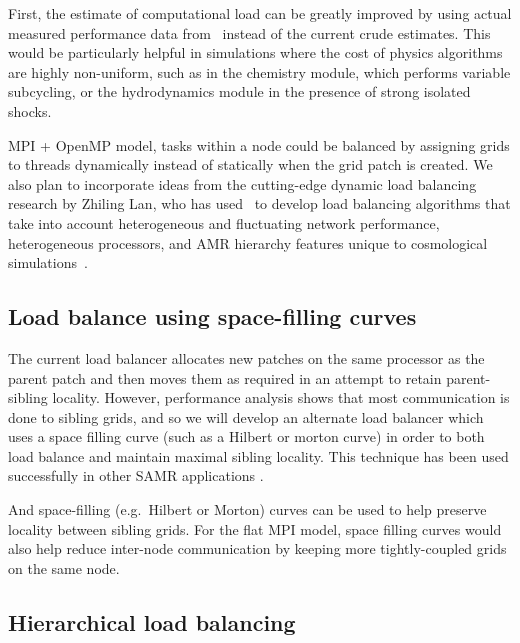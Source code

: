 \documentclass{article}
\begin{document}
First, the estimate of computational load can be
greatly improved by using actual measured performance data from
\lcaperf\ instead of the current crude estimates.  This would be
particularly helpful in simulations where the cost of physics
algorithms are highly non-uniform, such as in the chemistry module,
which performs variable subcycling, or the hydrodynamics module in the
presence of strong isolated shocks.  

MPI + OpenMP model, tasks within a node could be balanced by assigning
grids to threads dynamically instead of statically when the grid patch
is created.  We also plan to incorporate ideas from the cutting-edge
dynamic load balancing research by Zhiling Lan, who has used \enzo\ to
develop load balancing algorithms that take into account heterogeneous
and fluctuating network performance, heterogeneous processors, and AMR
hierarchy features unique to cosmological simulations~\cite{LaTa06}.


\subsection{Load balance using space-filling curves}  \label{solution:amr-balance-hilbert}

The current load balancer allocates new patches on the same
processor as the parent patch and then moves them as required in an
attempt to retain parent-sibling locality.  However, performance
analysis shows that most communication is done to sibling grids, and
so we will develop an alternate load balancer which uses a space
filling curve (such as a Hilbert or morton curve) in order to both
load balance and maintain maximal sibling locality.  This technique
has been used successfully in other SAMR applications
\cite{WHH03,LWBH07}.

And
space-filling (e.g.~Hilbert or Morton) curves can be used to help
preserve locality between sibling grids.  For the flat MPI model,
space filling curves would also help reduce inter-node communication
by keeping more tightly-coupled grids on the same node.

\subsection{Hierarchical load balancing}\label{solution:amr-balance-hierarchical}
\end{document}
